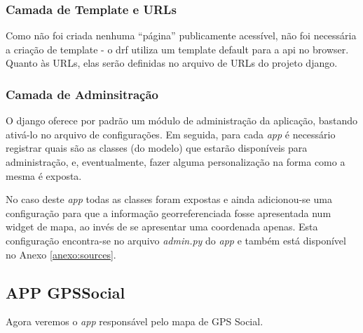 \subsubsection{Camada de Template e URLs}
Como não foi criada nenhuma ``página'' publicamente acessível, não foi necessária a criação de template - o \gls{drf} utiliza um template default para a \gls{api} no browser. Quanto às URLs, elas serão definidas no arquivo de URLs do projeto \gls{django}.

\subsubsection{Camada de Adminsitração}
O \gls{django} oferece por padrão um módulo de administração da aplicação, bastando ativá-lo no arquivo de configurações. Em seguida, para cada \textit{app} é necessário registrar quais são as classes (do modelo) que estarão disponíveis para administração, e, eventualmente, fazer alguma personalização na forma como a mesma é exposta.

No caso deste \textit{app} todas as classes foram expostas e ainda adicionou-se uma configuração para que a informação georreferenciada fosse apresentada num widget de mapa, ao invés de se apresentar uma coordenada apenas. Esta configuração encontra-se no arquivo \textit{admin.py} do \textit{app} e também está disponível no Anexo \ref{anexo:sources}.

\clearpage
\subsection{APP GPSSocial}
Agora veremos o \textit{app} responsável pelo mapa de GPS Social.

